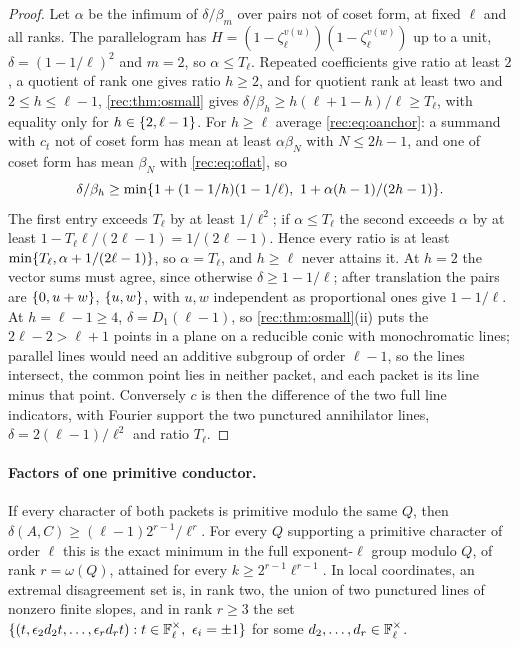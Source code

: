 \begin{proof}
Let $\alpha$ be the infimum of $\delta/\beta_m$ over pairs not of coset form, at fixed $\ell$ and all ranks. The parallelogram has
$H=(1-\zeta_\ell^{v(u)})(1-\zeta_\ell^{v(w)})$ up to a unit, $\delta=(1-1/\ell)^2$ and $m=2$, so $\alpha\le T_\ell$. Repeated coefficients give
ratio at least $2$, a quotient of rank one gives ratio $h\ge2$, and for quotient rank at least two and
$2\le h\le\ell-1$, \cref{rec:thm:osmall} gives $\delta/\beta_h\ge h(\ell+1-h)/\ell\ge T_\ell$, with equality only for $h\in\{2,\ell-1\}$. For
$h\ge\ell$ average \eqref{rec:eq:oanchor}: a summand with $c_t$ not of coset form has mean at least $\alpha\beta_N$ with $N\le2h-1$,
and one of coset form has mean $\beta_N$ with \eqref{rec:eq:oflat}, so
\[
 \delta/\beta_h\ge\min\set{1+(1-1/h)(1-1/\ell),\ 1+\alpha(h-1)/(2h-1)}.
\]
The first entry exceeds $T_\ell$ by at least $1/\ell^2$; if $\alpha\le T_\ell$ the second exceeds $\alpha$ by at least
$1-T_\ell\ell/(2\ell-1)=1/(2\ell-1)$. Hence every ratio is at least $\min\{T_\ell,\alpha+1/(2\ell-1)\}$, so $\alpha=T_\ell$, and $h\ge\ell$ never
attains it. At $h=2$ the vector sums must agree, since otherwise $\delta\ge1-1/\ell$; after translation the pairs are
$\{0,u+w\}$, $\{u,w\}$, with $u,w$ independent as proportional ones give $1-1/\ell$. At $h=\ell-1\ge4$, $\delta=D_1(\ell-1)$, so
\cref{rec:thm:osmall}(ii) puts the $2\ell-2>\ell+1$ points in a plane on a reducible conic with monochromatic lines;
parallel lines would need an additive subgroup of order $\ell-1$, so the lines intersect, the common point lies in
neither packet, and each packet is its line minus that point. Conversely $c$ is then the difference of the two
full line indicators, with Fourier support the two punctured annihilator lines, $\delta=2(\ell-1)/\ell^2$ and ratio $T_\ell$.
\end{proof}

\paragraph{Factors of one primitive conductor.}

\begin{theorem}\label{rec:thm:oprim}
If every character of both packets is primitive modulo the same $Q$, then $\delta(A,C)\ge(\ell-1)2^{r-1}/\ell^r$. For every
$Q$ supporting a primitive character of order $\ell$ this is the exact minimum in the full exponent-$\ell$ group
modulo $Q$, of rank $r=\omega(Q)$, attained for every $k\ge2^{r-1}\ell^{r-1}$. In local coordinates, an extremal
disagreement set is, in rank two, the union of two punctured lines of nonzero finite slopes, and in rank $r\ge3$
the set $\set{(t,\epsilon_2d_2t,\dots,\epsilon_rd_rt):t\in\F_\ell^\times,\ \epsilon_i=\pm1}$ for some $d_2,\dots,d_r\in\mathbb{F}_\ell^\times$.
\end{theorem}

